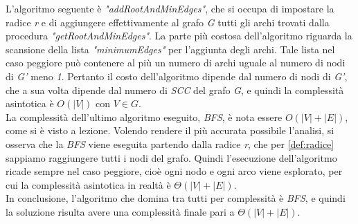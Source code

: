 \documentclass[10pt,a4paper,oneside,article,italian]{memoir}
\theoremstyle{definition}
\begin{document}
L'algoritmo seguente è \textit{"addRootAndMinEdges"}, che si occupa di impostare la radice \textit{r} e di aggiungere effettivamente al grafo \textit{G} tutti gli archi trovati dalla procedura \textit{"getRootAndMinEdges"}. La parte più costosa dell'algoritmo riguarda la scansione della lista \textit{"minimumEdges"} per l'aggiunta degli archi. Tale lista nel caso peggiore può contenere al più un numero di archi uguale al numero di nodi di \textit{G'} meno \textit{1}. Pertanto il costo dell'algoritmo dipende dal numero di nodi di \textit{G'}, che a sua volta dipende dal numero di \textit{SCC} del grafo \textit{G}, e quindi la complessità asintotica è \textit{$O(|V|)$} con \textit{$V \in G$}.\\
La complessità dell'ultimo algoritmo eseguito, \textit{BFS}, è nota essere \textit{$O(|V|+|E|)$}, come si è visto a lezione. Volendo rendere il più accurata possibile l'analisi, si osserva che la \textit{BFS} viene eseguita partendo dalla radice \textit{r}, che per \cref{def:radice} sappiamo raggiungere tutti i nodi del grafo. Quindi l'esecuzione dell'algoritmo ricade sempre nel caso peggiore, cioè ogni nodo e ogni arco viene esplorato, per cui la complessità asintotica in realtà è \textit{$\Theta(|V|+|E|)$}.\\
In conclusione, l'algoritmo che domina tra tutti per complessità è \textit{BFS}, e quindi la soluzione risulta avere una complessità finale pari a \textit{$\Theta(|V|+|E|)$}.
\end{document}
